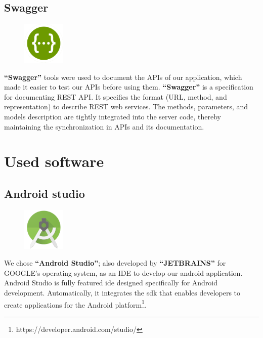 \documentclass[12pt,a4paper]{report}
\begin{document}
	\subsection{Swagger}
		\begin{figure}
		\centering
		\includegraphics[width=0.8in]{Swagger-logo.png}	
		
	\end{figure}
	\textbf{``Swagger''} tools were used to document the APIs of our application, which made it easier to test our APIs before using them. \textbf{``Swagger''} is a specification for documenting REST API. It specifies the format (URL, method, and representation) to describe REST web services. The methods, parameters, and models description are tightly integrated into the server code, thereby maintaining the synchronization in APIs and its documentation.
	\section{Used software}
	\subsection{Android studio}
	\begin{figure}
		\centering
		\includegraphics[width=0.8in]{aslogo.png}	
		
	\end{figure}
	We chose \textbf{``Android Studio''}; also developed by \textbf{``JETBRAINS''} for GOOGLE's operating system, as an IDE to develop our android application. Android Studio is fully featured \ac{ide} designed specifically for Android development. Automatically, it integrates the \ac{sdk} that enables developers to create applications for the Android platform\footnote{https://developer.android.com/studio/}.\par
	
\end{document}

